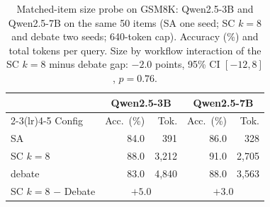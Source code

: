 \begin{table}[t]\centering\small
\caption{Matched-item size probe on GSM8K: Qwen2.5-3B and Qwen2.5-7B on the same 50 items (SA one seed; SC $k{=}8$ and debate two seeds; 640-token cap). Accuracy (\%) and total tokens per query. Size by workflow interaction of the SC $k{=}8$ minus debate gap: $-2.0$ points, 95\% CI $[-12,8]$, $p{=}0.76$.}
\label{tab:scale}
\begin{tabular}{lrrrr}
\toprule
& \multicolumn{2}{c}{Qwen2.5-3B} & \multicolumn{2}{c}{Qwen2.5-7B} \\
\cmidrule(lr){2-3}\cmidrule(lr){4-5}
Config & Acc.\ (\%) & Tok. & Acc.\ (\%) & Tok. \\
\midrule
SA & 84.0 & 391 & 86.0 & 328 \\
SC $k{=}8$ & 88.0 & 3{,}212 & 91.0 & 2{,}705 \\
debate & 83.0 & 4{,}840 & 88.0 & 3{,}563 \\
\midrule
SC $k{=}8$ $-$ Debate & \multicolumn{2}{c}{$+5.0$} & \multicolumn{2}{c}{$+3.0$} \\
\bottomrule
\end{tabular}
\end{table}
